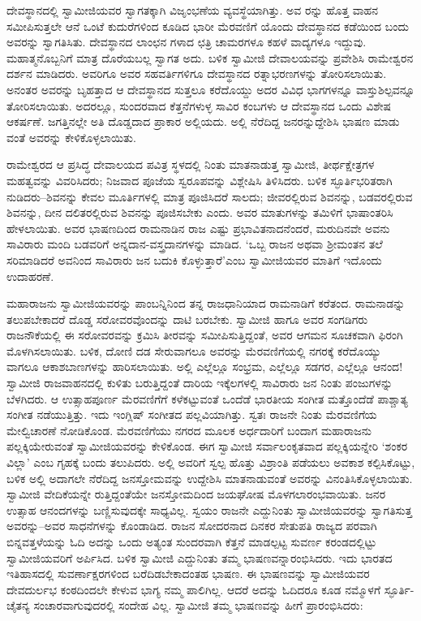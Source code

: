 ದೇವಸ್ಥಾನದಲ್ಲಿ ಸ್ವಾಮೀಜಿಯವರ ಸ್ವಾಗತಕ್ಕಾಗಿ ವಿಜೃಂಭಣೆಯ ವ್ಯವಸ್ಥೆಯಾಗಿತ್ತು. ಅವ ರನ್ನು ಹೊತ್ತ ವಾಹನ ಸಮೀಪಿಸುತ್ತಲೇ ಆನೆ ಒಂಟೆ ಕುದುರೆಗಳಿಂದ ಕೂಡಿದ ಭಾರೀ ಮೆರವಣಿಗೆ ಯೊಂದು ದೇವಸ್ಥಾನದ ಕಡೆಯಿಂದ ಬಂದು ಅವರನ್ನು ಸ್ವಾಗತಿಸಿತು. ದೇವಸ್ಥಾನದ ಲಾಂಛನ ಗಳಾದ ಛತ್ರಿ ಚಾಮರಗಳೂ ಕಹಳೆ ವಾದ್ಯಗಳೂ ಇದ್ದುವು. ಮಹಾತ್ಮನೊಬ್ಬನಿಗೆ ಮಾತ್ರ ದೊರೆಯಬಲ್ಲ ಸ್ವಾಗತ ಅದು. ಬಳಿಕ ಸ್ವಾಮೀಜಿ ದೇವಾಲಯವನ್ನು ಪ್ರವೇಶಿಸಿ ರಾಮೇಶ್ವರನ ದರ್ಶನ ಮಾಡಿದರು. ಅವರಿಗೂ ಅವರ ಸಹವರ್ತಿಗಳಿಗೂ ದೇವಸ್ಥಾನದ ರತ್ನಾಭರಣಗಳನ್ನು ತೋರಿಸಲಾಯಿತು. ಅನಂತರ ಅವರನ್ನು ಬೃಹತ್ತಾದ ಆ ದೇವಸ್ಥಾನದ ಸುತ್ತಲೂ ಕರೆದೊಯ್ದು ಅದರ ವಿವಿಧ ಭಾಗಗಳನ್ನೂ ವಾಸ್ತುಶಿಲ್ಪವನ್ನೂ ತೋರಿಸಲಾಯಿತು. ಅದರಲ್ಲೂ, ಸುಂದರವಾದ ಕೆತ್ತನೆಗಳುಳ್ಳ ಸಾವಿರ ಕಂಬಗಳು ಆ ದೇವಸ್ಥಾನದ ಒಂದು ವಿಶೇಷ ಆಕರ್ಷಣೆ. ಜಗತ್ತಿನಲ್ಲೇ ಅತಿ ದೊಡ್ಡದಾದ ಪ್ರಾಕಾರ ಅಲ್ಲಿಯದು. ಅಲ್ಲಿ ನೆರೆದಿದ್ದ ಜನರನ್ನುದ್ದೇಶಿಸಿ ಭಾಷಣ ಮಾಡು ವಂತೆ ಅವರನ್ನು ಕೇಳಿಕೊಳ್ಳಲಾಯಿತು.

ರಾಮೇಶ್ವರದ ಆ ಪ್ರಸಿದ್ಧ ದೇವಾಲಯದ ಪವಿತ್ರ ಸ್ಥಳದಲ್ಲಿ ನಿಂತು ಮಾತನಾಡುತ್ತ ಸ್ವಾಮೀಜಿ, ತೀರ್ಥಕ್ಷೇತ್ರಗಳ ಮಹತ್ವವನ್ನು ವಿವರಿಸಿದರು; ನಿಜವಾದ ಪೂಜೆಯ ಸ್ವರೂಪವನ್ನು ವಿಶ್ಲೇಷಿಸಿ ತಿಳಿಸಿದರು. ಬಳಿಕ ಸ್ಫೂರ್ತಿಭರಿತರಾಗಿ ನುಡಿದರು–ಶಿವನನ್ನು ಕೇವಲ ಮೂರ್ತಿಗಳಲ್ಲಿ ಮಾತ್ರ ಪೂಜಿಸಿದರೆ ಸಾಲದು; ಜೀವರಲ್ಲಿರುವ ಶಿವನನ್ನು, ಬಡವರಲ್ಲಿರುವ ಶಿವನನ್ನು, ದೀನ ದಲಿತರಲ್ಲಿರುವ ಶಿವನನ್ನು ಪೂಜಿಸಬೇಕು ಎಂದು. ಅವರ ಮಾತುಗಳನ್ನು ತಮಿಳಿಗೆ ಭಾಷಾಂತರಿಸಿ ಹೇಳಲಾಯಿತು. ಅವರ ಭಾಷಣದಿಂದ ರಾಮನಾಡಿನ ರಾಜ ಎಷ್ಟು ಪ್ರಭಾವಿತನಾದನೆಂದರೆ, ಮರುದಿನವೇ ಅವನು ಸಾವಿರಾರು ಮಂದಿ ಬಡವರಿಗೆ ಅನ್ನದಾನ-ವಸ್ತ್ರದಾನಗಳನ್ನು ಮಾಡಿದ. ‘ಒಬ್ಬ ರಾಜನ ಅಥವಾ ಶ್ರೀಮಂತನ ತಲೆ ಸರಿಮಾಡಿದರೆ ಅವನಿಂದ ಸಾವಿರಾರು ಜನ ಬದುಕಿ ಕೊಳ್ಳುತ್ತಾರೆ’ಎಂಬ ಸ್ವಾಮೀಜಿಯವರ ಮಾತಿಗೆ ಇದೊಂದು ಉದಾಹರಣೆ.

ಮಹಾರಾಜನು ಸ್ವಾಮೀಜಿಯವರನ್ನು ಪಾಂಬನ್ನಿನಿಂದ ತನ್ನ ರಾಜಧಾನಿಯಾದ ರಾಮನಾಡಿಗೆ ಕರೆತಂದ. ರಾಮನಾಡನ್ನು ತಲುಪಬೇಕಾದರೆ ದೊಡ್ಡ ಸರೋವರವೊಂದನ್ನು ದಾಟಿ ಬರಬೇಕು. ಸ್ವಾಮೀಜಿ ಹಾಗೂ ಅವರ ಸಂಗಡಿಗರು ರಾಜನೌಕೆಯಲ್ಲಿ ಈ ಸರೋವರವನ್ನು ಕ್ರಮಿಸಿ ತೀರವನ್ನು ಸಮೀಪಿಸುತ್ತಿದ್ದಂತೆ, ಅವರ ಆಗಮನ ಸೂಚಕವಾಗಿ ಫಿರಂಗಿ ಮೊಳಗಿಸಲಾಯಿತು. ಬಳಿಕ, ದೋಣಿ ದಡ ಸೇರುವಾಗಲೂ ಅವರನ್ನು ಮೆರವಣಿಗೆಯಲ್ಲಿ ನಗರಕ್ಕೆ ಕರೆದೊಯ್ಯು ವಾಗಲೂ ಆಕಾಶಬಾಣಗಳನ್ನು ಹಾರಿಸಲಾಯಿತು. ಅಲ್ಲಿ ಎಲ್ಲೆಲ್ಲೂ ಸಂಭ್ರಮ, ಎಲ್ಲೆಲ್ಲೂ ಸಡಗರ, ಎಲ್ಲೆಲ್ಲೂ ಆನಂದ! ಸ್ವಾಮೀಜಿ ರಾಜವಾಹನದಲ್ಲಿ ಕುಳಿತು ಬರುತ್ತಿದ್ದಂತೆ ದಾರಿಯ ಇಕ್ಕೆಲಗಳಲ್ಲಿ ಸಾವಿರಾರು ಜನ ನಿಂತು ಪಂಜುಗಳನ್ನು ಬೆಳಗಿದರು. ಆ ಉತ್ಸಾಹಪೂರ್ಣ ಮೆರವಣಿಗೆಗೆ ಕಳೆಕಟ್ಟುವಂತೆ ಒಂದೆಡೆ ಭಾರತೀಯ ಸಂಗೀತ ಮತ್ತೊಂದೆಡೆ ಪಾಶ್ಚಾತ್ಯ ಸಂಗೀತ ನಡೆಯುತ್ತಿತ್ತು. ಇದು ಇಂಗ್ಲಿಷ್ ಸಂಗೀತದ ಪಲ್ಲವಿಯಾಗಿತ್ತು. ಸ್ವತಃ ರಾಜನೇ ನಿಂತು ಮೆರವಣಿಗೆಯ ಮೇಲ್ವಿಚಾರಣೆ ನೋಡಿಕೊಂಡ. ಮೆರವಣಿಗೆಯು ನಗರದ ಮೂಲಕ ಅರ್ಧದಾರಿಗೆ ಬಂದಾಗ ಮಹಾರಾಜನು ಪಲ್ಲಕ್ಕಿಯೇರುವಂತೆ ಸ್ವಾಮೀಜಿಯವರನ್ನು ಕೇಳಿಕೊಂಡ. ಈಗ ಸ್ವಾಮೀಜಿ ಸರ್ವಾಲಂಕೃತವಾದ ಪಲ್ಲಕ್ಕಿಯನ್ನೇರಿ ‘ಶಂಕರ ವಿಲ್ಲಾ’ ಎಂಬ ಗೃಹಕ್ಕೆ ಬಂದು ತಲುಪಿದರು. ಅಲ್ಲಿ ಅವರಿಗೆ ಸ್ವಲ್ಪ ಹೊತ್ತು ವಿಶ್ರಾಂತಿ ಪಡೆಯಲು ಅವಕಾಶ ಕಲ್ಪಿಸಿಕೊಟ್ಟು, ಬಳಿಕ ಅಲ್ಲಿ ಅದಾಗಲೇ ನೆರೆದಿದ್ದ ಜನಸ್ತೋಮವನ್ನು ಉದ್ದೇಶಿಸಿ ಮಾತನಾಡುವಂತೆ ಅವರನ್ನು ವಿನಂತಿಸಿಕೊಳ್ಳಲಾಯಿತು. ಸ್ವಾಮೀಜಿ ವೇದಿಕೆಯನ್ನೇ ರುತ್ತಿದ್ದಂತೆಯೇ ಜನಸ್ತೋಮದಿಂದ ಜಯಘೋಷ ಮೊಳಗಲಾರಂಭವಾಯಿತು. ಜನರ ಉತ್ಸಾಹ ಆನಂದಗಳನ್ನು ಬಣ್ಣಿಸುವುದಕ್ಕೇ ಸಾಧ್ಯವಿಲ್ಲ. ಸ್ವಯಂ ರಾಜನೇ ಎದ್ದುನಿಂತು ಸ್ವಾಮೀಜಿಯವರನ್ನು ಸ್ವಾಗತಿಸುತ್ತ ಅವರನ್ನು–ಅವರ ಸಾಧನೆಗಳನ್ನು ಕೊಂಡಾಡಿದ. ರಾಜನ ಸೋದರನಾದ ದಿನಕರ ಸೇತುಪತಿ ರಾಜ್ಯದ ಪರವಾಗಿ ಬಿನ್ನವತ್ತಳೆಯನ್ನು ಓದಿ ಅದನ್ನು ಒಂದು ಅತ್ಯಂತ ಸುಂದರವಾಗಿ ಕೆತ್ತನೆ ಮಾಡಲ್ಪಟ್ಟ ಸುವರ್ಣ ಕರಂಡದಲ್ಲಿಟ್ಟು ಸ್ವಾಮೀಜಿಯವರಿಗೆ ಅರ್ಪಿಸಿದ. ಬಳಿಕ ಸ್ವಾಮೀಜಿ ಎದ್ದುನಿಂತು ತಮ್ಮ ಭಾಷಣವನ್ನಾರಂಭಿಸಿದರು. ಇದು ಭಾರತದ ಇತಿಹಾಸದಲ್ಲಿ ಸುವರ್ಣಾಕ್ಷರಗಳಿಂದ ಬರೆದಿಡಬೇಕಾದಂತಹ ಭಾಷಣ. ಈ ಭಾಷಣವನ್ನು ಸ್ವಾಮೀಜಿಯವರ ದೇವದುರ್ಲಭ ಕಂಠದಿಂದಲೇ ಕೇಳುವ ಭಾಗ್ಯ ನಮ್ಮ ಪಾಲಿಗಿಲ್ಲ. ಆದರೆ ಅದನ್ನು ಓದಿದರೂ ಕೂಡ ನಮ್ಮೊಳಗೆ ಸ್ಫೂರ್ತಿ-ಚೈತನ್ಯ ಸಂಚಾರವಾಗುವುದರಲ್ಲಿ ಸಂದೇಹ ವಿಲ್ಲ. ಸ್ವಾಮೀಜಿ ತಮ್ಮ ಭಾಷಣವನ್ನು ಹೀಗೆ ಪ್ರಾರಂಭಿಸಿದರು:

